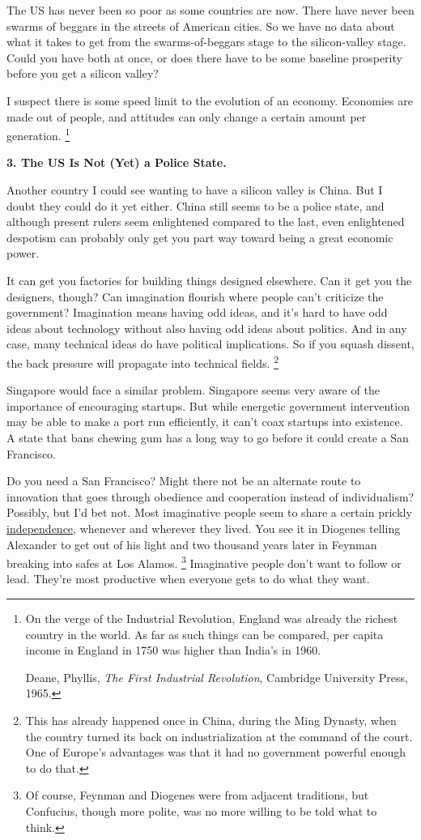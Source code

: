 \documentclass[12pt]{book}
\begin{document}
The US has never been so poor as some countries are now. There have
never been swarms of beggars in the streets of American cities. So we
have no data about what it takes to get from the swarms-of-beggars stage
to the silicon-valley stage. Could you have both at once, or does there
have to be some baseline prosperity before you get a silicon valley?

I suspect there is some speed limit to the evolution of an economy.
Economies are made out of people, and attitudes can only change a
certain amount per generation. \footnote{On the verge of the Industrial Revolution, England was already
the richest country in the world. As far as such things can be compared,
per capita income in England in 1750 was higher than India's in 1960.

Deane, Phyllis, \emph{The First Industrial Revolution}, Cambridge
University Press, 1965.}

\textbf{3. The US Is Not (Yet) a Police State.}

Another country I could see wanting to have a silicon valley is China.
But I doubt they could do it yet either. China still seems to be a
police state, and although present rulers seem enlightened compared to
the last, even enlightened despotism can probably only get you part way
toward being a great economic power.

It can get you factories for building things designed elsewhere. Can it
get you the designers, though? Can imagination flourish where people
can't criticize the government? Imagination means having odd ideas, and
it's hard to have odd ideas about technology without also having odd
ideas about politics. And in any case, many technical ideas do have
political implications. So if you squash dissent, the back pressure will
propagate into technical fields. \footnote{This has already happened once in China, during the Ming
Dynasty, when the country turned its back on industrialization at the
command of the court. One of Europe's advantages was that it had no
government powerful enough to do that.}

Singapore would face a similar problem. Singapore seems very aware of
the importance of encouraging startups. But while energetic government
intervention may be able to make a port run efficiently, it can't coax
startups into existence. A state that bans chewing gum has a long way to
go before it could create a San Francisco.

Do you need a San Francisco? Might there not be an alternate route to
innovation that goes through obedience and cooperation instead of
individualism? Possibly, but I'd bet not. Most imaginative people seem
to share a certain prickly \href{gba.html}{independence}, whenever and
wherever they lived. You see it in Diogenes telling Alexander to get out
of his light and two thousand years later in Feynman breaking into safes
at Los Alamos. \footnote{Of course, Feynman and Diogenes were from adjacent traditions,
but Confucius, though more polite, was no more willing to be told what
to think.} Imaginative people don't want to
follow or lead. They're most productive when everyone gets to do what
they want.
\end{document}
